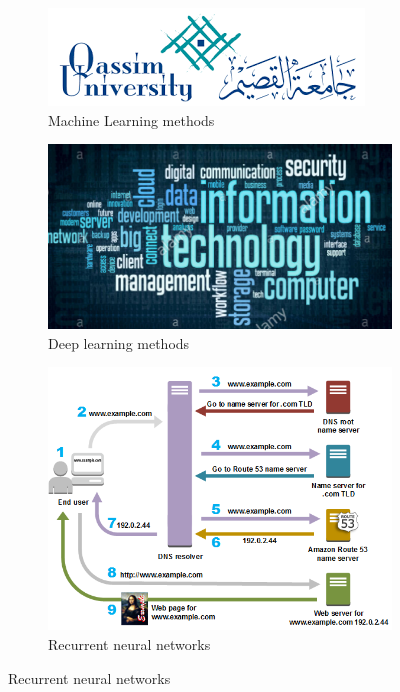 \begin{figure}[ht]
\centering
    \begin{subfigure}{.22\textwidth}
         \centering
          \includegraphics[width=.8\linewidth]{figures/samples/qu.png}
           \caption{{\tiny Machine Learning methods}}
        \label{fig:sub1}
        \end{subfigure}%
    \begin{subfigure}{.22\textwidth}
         \centering
        \includegraphics[width=.8\linewidth]{figures/samples/it.png}
        \caption{Deep learning methods}
        \label{fig:sub2}
        \end{subfigure}
            \begin{subfigure}{.22\textwidth}
         \centering
        \includegraphics[width=.8\linewidth]{figures/samples/Fig1.png}
        \caption{Recurrent neural networks}

\end{subfigure}
\end{figure}

